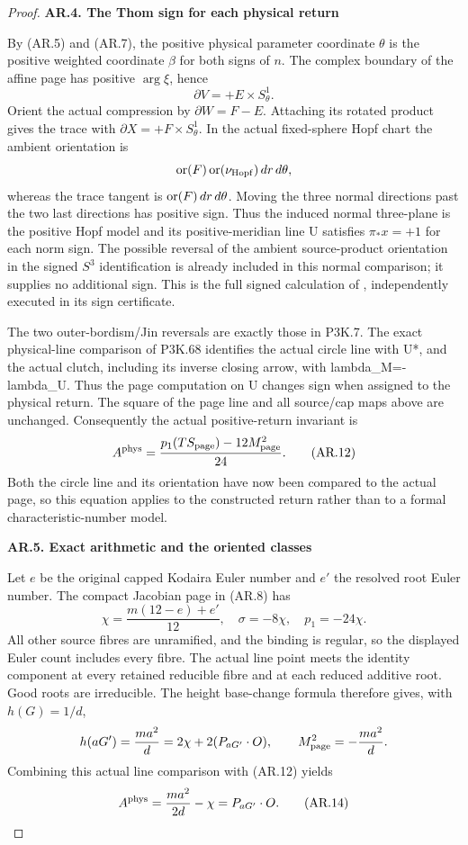 \begin{proof}
\par

\medskip\noindent\textbf{AR.4. The Thom sign for each physical return}

By (AR.5) and (AR.7), the positive physical parameter coordinate
\(\theta\) is the positive weighted coordinate \(\beta\)
for both signs of \(n\). The complex boundary of the affine
page has positive \(\arg\xi\), hence
\[
                         \partial V=+E\times S^1_\theta.
\]
Orient the actual compression by \(\partial W=F-E\).
Attaching its rotated product gives the trace with
\(\partial X=+F\times S^1_\theta\). In the actual
fixed-sphere Hopf chart the ambient orientation is
\[
 {\rm or}(F)\,{\rm or}(\nu_{\rm Hopf})\,dr\,d\theta,
\]
whereas the trace tangent is \({\rm or}(F)\,dr\,d\theta\).
Moving the three normal directions past the two last directions
has positive sign. Thus the induced normal three-plane is the
positive Hopf model and its positive-meridian line U satisfies
\(\pi_*x=+1\) for each norm sign. The possible reversal of
the ambient source-product orientation in the signed \(S^3\)
identification is already included in this normal comparison;
it supplies no additional sign. This is the full signed
calculation of , independently
executed in its sign certificate.

The two outer-bordism/Jin reversals are exactly those in P3K.7.
The exact physical-line comparison of P3K.68 identifies the actual
circle line with U*, and the actual clutch, including its inverse
closing arrow, with lambda\_M=-lambda\_U. Thus the page computation
on U changes sign when assigned to the physical return. The square
of the page line and all source/cap maps above are unchanged.
Consequently the actual positive-return invariant is
\[
 A^{\rm phys}=\frac{p_1(TS_{\rm page})-12M_{\rm page}^2}{24}.
                                                        \tag{AR.12}
\]
Both the circle line and its orientation have now been compared
to the actual page, so this equation applies to the constructed
return rather than to a formal characteristic-number model.

\par

\medskip\noindent\textbf{AR.5. Exact arithmetic and the oriented classes}

Let \(e\) be the original capped Kodaira Euler number and
\(e'\) the resolved root Euler number. The compact Jacobian
page in (AR.8) has
\[
 \chi=\frac{m(12-e)+e'}{12},\quad
 \sigma=-8\chi,\quad p_1=-24\chi.                    \tag{AR.13}
\]
All other source fibres are unramified, and the binding is
regular, so the displayed Euler count includes every fibre.
The actual line point meets the identity component at every
retained reducible fibre and at each reduced additive root.
Good roots are irreducible. The height base-change formula
therefore gives, with \(h(G)=1/d\),
\[
 h(aG')=\frac{ma^2}{d}=2\chi+2(P_{aG'}\cdot O),
 \qquad M_{\rm page}^2=-\frac{ma^2}{d}.
\]
Combining this actual line comparison with (AR.12) yields
\[
 A^{\rm phys}=\frac{ma^2}{2d}-\chi=P_{aG'}\cdot O.
                                                        \tag{AR.14}
\]


\end{proof}
